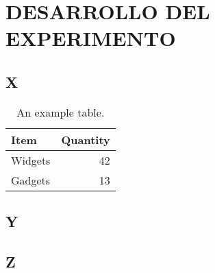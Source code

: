 \chapter{DESARROLLO DEL EXPERIMENTO}
\section{X}



\begin{table}
	\centering
	\begin{tabular}{l|r}
		Item & Quantity \\\hline
		Widgets & 42 \\
		Gadgets & 13
	\end{tabular}
	\caption{\label{tab:widgets1}An example table.}
\end{table}

\section{Y}




\section{Z}


